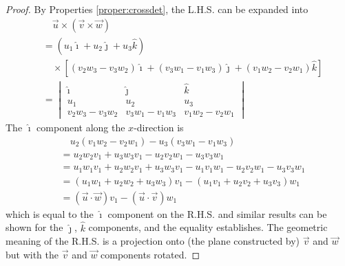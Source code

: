 \begin{proof}
By Properties \ref{proper:crossdet}, the L.H.S. can be expanded into
\begin{align*}
&\quad\vec{u} \times (\vec{v} \times \vec{w}) \\
&= (u_1\hat{\imath} + u_2\hat{\jmath} + u_3\hat{k}) \\
&\quad \times [(v_2w_3 - v_3w_2)\hat{\imath} + (v_3w_1 - v_1w_3)\hat{\jmath} + (v_1w_2 - v_2w_1)\hat{k}] \\
&= 
\begin{vmatrix}
\hat{\imath} & \hat{\jmath} & \hat{k} \\
u_1 & u_2 & u_3 \\
v_2w_3 - v_3w_2 & v_3w_1 - v_1w_3 & v_1w_2 - v_2w_1 
\end{vmatrix}
\end{align*}
The $\hat{\imath}$ component along the $x$-direction is
\begin{align*}
&\quad u_2(v_1w_2 - v_2w_1) - u_3(v_3w_1 - v_1w_3) \\
&= u_2w_2v_1 + u_3w_3v_1 - u_2v_2w_1 - u_3v_3w_1 \\
&= u_1w_1v_1 + u_2w_2v_1 + u_3w_3v_1 - u_1v_1w_1 - u_2v_2w_1 - u_3v_3w_1 \\
&= (u_1w_1 + u_2w_2 + u_3w_3)v_1 - (u_1v_1 + u_2v_2 + u_3v_3)w_1 \\
&= (\vec{u} \cdot \vec{w})v_1 - (\vec{u} \cdot \vec{v})w_1
\end{align*}
which is equal to the $\hat{\imath}$ component on the R.H.S. and similar results can be shown for the $\hat{\jmath}$, $\hat{k}$ components, and the equality establishes. The geometric meaning of the R.H.S. is a projection onto (the plane constructed by) $\vec{v}$ and $\vec{w}$ but with the $\vec{v}$ and $\vec{w}$ components rotated.
\end{proof}

